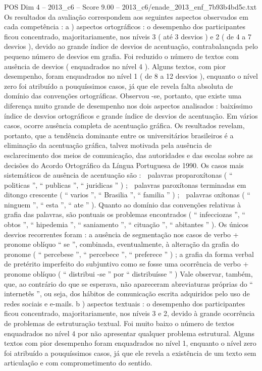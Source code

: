 \begin{textsample}{POS Dim 4 – 2013\_c6 – Score 9.00 – 2013\_c6/enade\_2013\_enf\_7b93b4bd5c.txt}
Os resultados da avaliação correspondem aos seguintes aspectos observados em cada competência : a ) aspectos ortográficos : o desempenho dos participantes ficou concentrado, majoritariamente, nos níveis 3 ( até 3 desvios ) e 2 ( de 4 a 7 desvios ), devido ao grande índice de desvios de acentuação, contrabalançada pelo pequeno número de desvios em grafia.
Foi reduzido o número de textos com ausência de desvios ( enquadrados no nível 4 ).
Alguns textos, com pior desempenho, foram enquadrados no nível 1 ( de 8 a 12 desvios ), enquanto o nível zero foi atribuído a pouquíssimos casos, já que ele revela falta absoluta de domínio das convenções ortográficas.
Observou -se, portanto, que existe uma diferença muito grande de desempenho nos dois aspectos analisados : baixíssimo índice de desvios ortográficos e grande índice de desvios de acentuação.
Em vários casos, ocorre ausência completa de acentuação gráfica.
Os resultados revelam, portanto, que a tendência dominante entre os universitários brasileiros é a eliminação da acentuação gráfica, talvez motivada pela ausência de esclarecimento dos meios de comunicação, das autoridades e das escolas sobre as decisões do Acordo Ortográfico da Língua Portuguesa de 1990.
Os casos mais sistemáticos de ausência de acentuação são :  palavras proparoxítonas ( “ politicas ”, “ publicas ”, “ juridicas ” ) ;  palavras paroxítonas terminadas em ditongo crescente ( “ varios ”, “ Brasilia ”, “ familia ” ) ;  palavras oxítonas ( “ ninguem ”, “ esta ”, “ ate ” ).
Quanto ao domínio das convenções relativas à grafia das palavras, são pontuais os problemas encontrados ( “ infecciozas ”, “ obtos ”, “ hipedemia ”, “ saniamento ”, “ cituação ”, “ abitantes ” ).
Os únicos desvios recorrentes foram : a ausência de segmentação nos casos de verbo + pronome oblíquo “ se ”, combinada, eventualmente, à alteração da grafia do pronome ( “ percebese ”, “ percebece ”, “ preferece ” ) ; a grafia da forma verbal de pretérito imperfeito do subjuntivo como se fosse uma ocorrência de verbo + pronome oblíquo ( “ distribui -se ” por “ distribuísse ” ) Vale observar, também, que, ao contrário do que se esperava, não apareceram abreviaturas próprias do “ internetês ”, ou seja, dos hábitos de comunicação escrita adquiridos pelo uso de redes sociais e e-mails. b ) aspectos textuais : o desempenho dos participantes ficou concentrado, majoritariamente, nos níveis 3 e 2, devido à grande ocorrência de problemas de estruturação textual.
Foi muito baixo o número de textos enquadrados no nível 4 por não apresentar qualquer problema estrutural.
Alguns textos com pior desempenho foram enquadrados no nível 1, enquanto o nível zero foi atribuído a pouquíssimos casos, já que ele revela a existência de um texto sem articulação e com comprometimento do sentido.

\end{textsample}
